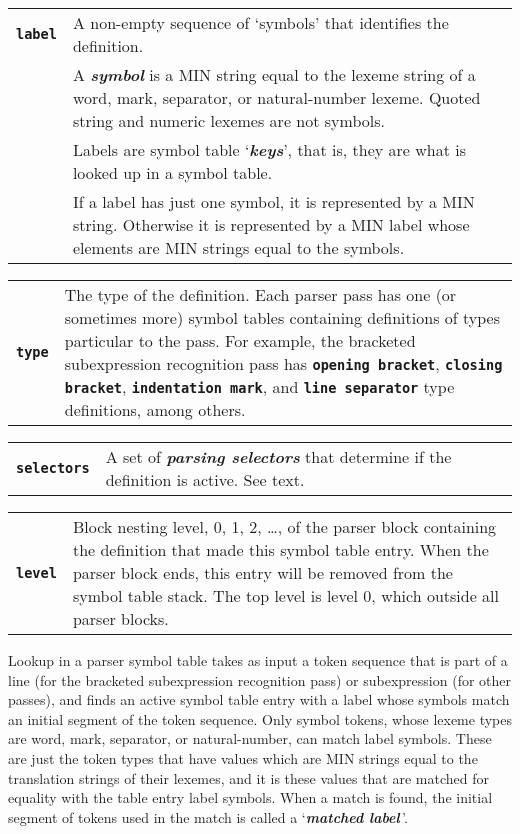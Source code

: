 \documentclass[12pt]{article}
\makeatletter
\newcommand{\TT}[1]{{\tt \bfseries #1}}
\newcommand{\key}[1]{{\bf \em #1}\index{#1}}
\newcommand{\skey}[2]{{\bf \em #1#2}\index{#1}}
\newcommand{\ttmkey}[2]{\TT{#1}\index{#1@{\tt #1}!#2}}
\newenvironment{indpar}[1][0.3in]%
	{\begin{list}{}%
		     {\setlength{\itemsep}{0in}%
		      \setlength{\topsep}{0in}%
		      \setlength{\parsep}{1ex}%
		      \setlength{\labelwidth}{#1}%
		      \setlength{\leftmargin}{#1}%
		      \addtolength{\leftmargin}{\labelsep}}%
	 \item}%
	{\end{list}}
\makeatother
\begin{document}
\begin{indpar}
\begin{tabular}{p{1in}p{4.5in}}
\ttmkey{label}{of symbol table entry}
		& A non-empty
		  sequence of `symbols' that identifies the definition.
\\[1ex]
		& A \key{symbol} is a MIN string equal to the
		  lexeme string of a word, mark, separator,
		  or natural-number lexeme.  Quoted string and numeric
		  lexemes are not symbols.
\\[1ex]
		& Labels are symbol table `\skey{key}s', that is, they
		  are what is looked up in a symbol table.
\\[1ex]
		& If a label has just one symbol, it is represented by
		  a MIN string.  Otherwise it is represented by
		  a MIN label whose elements are MIN strings
		  equal to the symbols.
\end{tabular}

\begin{tabular}{p{1in}p{4.5in}}
\ttmkey{type}{of symbol table entry}
		& The type of the definition.  Each parser pass has
		  one (or sometimes more) symbol tables containing
		  definitions of types particular to the pass.
		  For example, the bracketed subexpression recognition
		  pass has \TT{opening bracket}, \TT{closing bracket},
		  \TT{indentation mark}, and \TT{line separator}
		  type definitions, among others.
\end{tabular}

\begin{tabular}{p{1in}p{4.5in}}
\ttmkey{selectors}{of symbol table entry}
		& A set of \skey{parsing selector}s that determine if
		  the definition is active.  See text.
\end{tabular}

\begin{tabular}{p{1in}p{4.5in}}
\ttmkey{level}{of symbol table entry}
		& Block nesting level, 0, 1, 2, \ldots, of the parser block
		  containing the definition that made this symbol
		  table entry.  When the parser block ends, this entry
		  will be removed from the symbol table stack.  The top level is
		  level 0, which outside all parser blocks.
\end{tabular}
\end{indpar}

Lookup in a parser symbol table takes as input a token sequence
that is part of a line (for the bracketed subexpression recognition pass)
or subexpression (for other passes), and finds an active symbol table
entry with a label whose symbols match an initial segment of the
token sequence.  Only symbol tokens, whose lexeme types are word,
mark, separator, or natural-number, can match label symbols.  These are just
the token types that have values which are MIN strings equal to the
translation strings of their lexemes, and it is these values that
are matched for equality with the table entry label symbols.
When a match is found,
the initial segment of tokens used in the match is called
a `\key{matched label}\,'.
\end{document}
